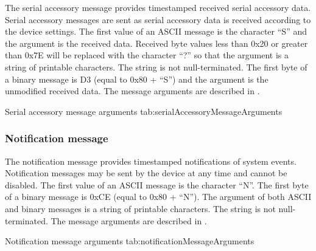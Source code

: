 The serial accessory message provides timestamped received serial accessory data.  Serial accessory messages are sent as serial accessory data is received according to the device settings.  The first value of an \ac{ASCII} message is the character \enquote{S} and the argument is the received data.  Received byte values less than 0x20 or greater than 0x7E will be replaced with the character \enquote{?} so that the argument is a string of printable characters.  The string is not null-terminated.  The first byte of a binary message is D3 (equal to 0x80 + \enquote{S}) and the argument is the unmodified received data.  The message arguments are described in .

\begingroup
    \def\tempArgumentA{Received serial accessory data}
    \dataMessageTable
    {Serial accessory message arguments}
    {tab:serialAccessoryMessageArguments}
\endgroup

\begingroup
    \def\tempNameA{Data}
    \def\tempValueA{0x61 0x62 0x63 0x31 0x32 0x33 0xF1 0xF2 0xF3}
    \def\tempAsciiFirst{S}
    \def\tempAsciiA{abc123???}
    \def\tempBinaryFirst{D3}
    \def\tempBinaryA{61 62 63 31 32 33 F1 F2 F3}
    \dataMessageExample
\endgroup

\subsubsection{Notification message}

The notification message provides timestamped notifications of system events.  Notification messages may be sent by the device at any time and cannot be disabled.  The first value of an \ac{ASCII} message is the character \enquote{N}.  The first byte of a binary message is 0xCE (equal to 0x80 + \enquote{N}).  The argument of both \ac{ASCII} and binary messages is a string of printable characters.  The string is not null-terminated.  The message arguments are described in .

\begingroup
    \def\tempArgumentA{Notification string}
    \dataMessageTable
    {Notification message arguments}
    {tab:notificationMessageArguments}
\endgroup

\begingroup
    \def\tempNameA{String}
    \def\tempValueA{This is a notification message.}
    \def\tempAsciiFirst{N}
    \def\tempAsciiA{This is a notification message.}
    \def\tempBinaryFirst{CE}
    \def\tempBinaryA{54 68 69 73 20 69 73 20 61 20 6E 6F 74 69 66 69 63 61 74 69 6F 6E 20 6D 65 73 73 61 67 65 2E}
    \dataMessageExample
\endgroup

